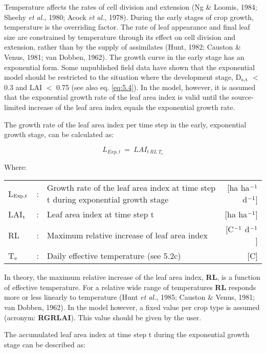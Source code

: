 Temperature affects the rates of cell division and extension (Ng \& Loomis, 1984; Sheehy
{\it et al.}, 1980; Acock {\it et al.}, 1978). During the early stages of crop growth, temperature is
the overriding factor. The rate of leaf appearance and final leaf size are constrained by
temperature through its effect on cell division and extension, rather than by the supply of
assimilates (Hunt, 1982; Causton \& Venus, 1981; van Dobben, 1962). The growth curve
in the early stage has an exponential form. Some unpublished field data have shown that
the exponential model should be restricted to the situation where the development stage, 
D$_{{\rm s,t}}$ $<$ 0.3 and LAI $<$ 0.75 (see also eq. \ref{eq:5.4}). In the model, however, it is assumed that
the exponential growth rate of the leaf area index is valid until the source-limited increase
of the leaf area index equals the exponential growth rate.

The growth rate of the leaf area index per time step in the early, exponential growth
stage, can be calculated as:

\begin{equation}
L _{Exp,t} ~=~LAI _{{t~RL~T}_{e}}
\end{equation}

Where:\\[5pt]
\begin{tabularx}{\textwidth}{llXr}
	L$_{{\rm Exp,t}}$ &:& Growth rate of the leaf area index at time step t
	during exponential growth stage   &    [ha ha$^{{\rm -1}}$ d$^{{\rm -1}}$]\\
	LAI$_{{\rm t}}$ &:& Leaf area index at time step t    &
	[ha ha$^{{\rm -1}}$]\\
	RL &:& Maximum relative increase of leaf area index   &
	[\degrees C$^{{\rm -1}}$ d$^{{\rm -1}}$]\\
	T$_{{\rm e}}$ &:& Daily effective temperature (see 5.2c)   &
	[\degrees C]\\
\end{tabularx}

In theory, the maximum relative increase of the leaf area index, {\bf RL}, is a function of
effective temperature. For a relative wide range of temperatures {\bf RL} responds more or
less linearly to temperature (Hunt {\it et al.}, 1985; Causton \& Venus, 1981; van Dobben,
1962). In the model however, a fixed value per crop type is assumed (acronym: 
{\bf RGRLAI}). This value should be given by the user.

The accumulated leaf area index at time step t during the exponential growth stage can be
described as:

